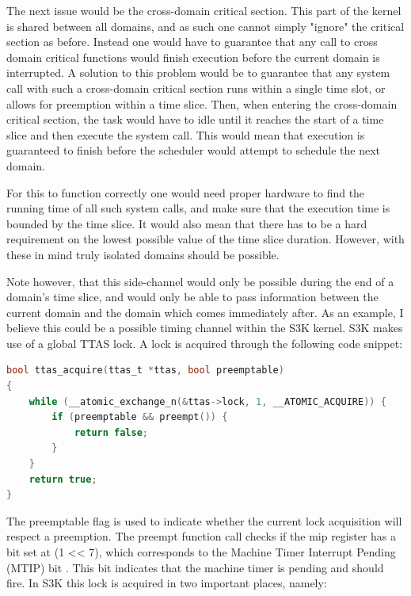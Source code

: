 The next issue would be the cross-domain critical section. This part of the
kernel is shared between all domains, and as such one cannot simply "ignore"
the critical section as before. Instead one would have to guarantee that any
call to cross domain critical functions would finish execution before the
current domain is interrupted. A solution to this problem would be to guarantee
that any system call with such a cross-domain critical section runs within a
single time slot, or allows for preemption within a time slice. Then, when
entering the cross-domain critical section, the task would have to idle until
it reaches the start of a time slice and then execute the system call. This
would mean that execution is guaranteed to finish before the scheduler would
attempt to schedule the next domain. 

For this to function correctly one would need proper hardware to find the
running time of all such system calls, and make sure that the execution time is
bounded by the time slice. It would also mean that there has to be a hard
requirement on the lowest possible value of the time slice duration. However,
with these in mind truly isolated domains should be possible.

Note however, that this side-channel would only be possible during the end of a
domain's time slice, and would only be able to pass information between the
current domain and the domain which comes immediately after. As an example, I
believe this could be a possible timing channel within the S3K kernel. S3K
makes use of a global TTAS lock. A lock is acquired through the following code
snippet:

\begin{lstlisting}[language=c]
bool ttas_acquire(ttas_t *ttas, bool preemptable)
{
	while (__atomic_exchange_n(&ttas->lock, 1, __ATOMIC_ACQUIRE)) {
		if (preemptable && preempt()) {
			return false;
		}
	}
	return true;
}
\end{lstlisting}

The preemptable flag is used to indicate whether the current lock acquisition
will respect a preemption. The preempt function call checks if the mip register
has a bit set at (1 << 7), which corresponds to the Machine Timer Interrupt
Pending (MTIP) bit \cite{MipRISCVISA}. This bit indicates that the machine
timer is pending and should fire. In S3K this lock is acquired in two important
places, namely:

